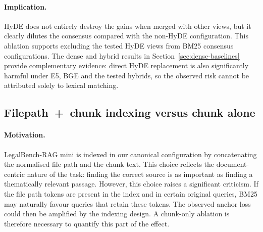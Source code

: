 \documentclass[a4paper,fleqn]{cas-dc}
\begin{document}
\paragraph{Implication.}
HyDE does not entirely destroy the gains when
merged with other views, but it clearly dilutes the
consensus compared with the non-HyDE configuration.
This ablation supports excluding the tested HyDE views from
BM25 consensus configurations. The dense and hybrid results
in Section~\ref{sec:dense-baselines} provide complementary
evidence: direct HyDE replacement is also significantly
harmful under E5, BGE and the tested hybrids, so the
observed risk cannot be attributed solely to lexical matching.
\subsection{Filepath~+~chunk indexing versus chunk
alone}
\label{sec:ablation-filepath}
\paragraph{Motivation.}
LegalBench-RAG mini is indexed in our
canonical configuration by concatenating the normalised
file path and the chunk text. This choice reflects the
document-centric nature of the task: finding the correct
source is as important as finding a thematically
relevant passage. However, this choice raises
a significant criticism. If the file path tokens
are present in the index and in certain
original queries, BM25 may naturally favour
queries that retain these tokens. The observed
anchor loss could then be amplified by the
indexing design. A chunk-only ablation is therefore
necessary to quantify this part of the effect.
\end{document}
